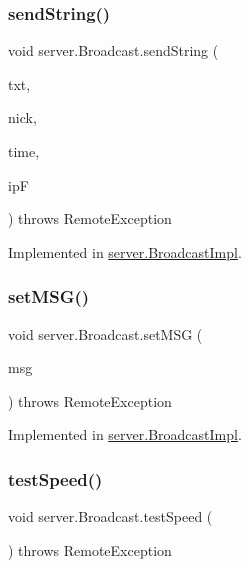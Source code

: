 \subsubsection{\texorpdfstring{send\+String()}{sendString()}}
{\footnotesize\ttfamily void server.\+Broadcast.\+send\+String (\begin{DoxyParamCaption}\item[{String}]{txt,  }\item[{String}]{nick,  }\item[{Local\+Time}]{time,  }\item[{String}]{ipF }\end{DoxyParamCaption}) throws Remote\+Exception}



Implemented in \hyperlink{classserver_1_1_broadcast_impl_a5abfc6721496474d39d6b2b31589d11b}{server.\+Broadcast\+Impl}.

\mbox{\label{interfaceserver_1_1_broadcast_a96f8dad32733e1d5e503435c11e324af}} 
\subsubsection{\texorpdfstring{set\+M\+S\+G()}{setMSG()}}
{\footnotesize\ttfamily void server.\+Broadcast.\+set\+M\+SG (\begin{DoxyParamCaption}\item[{\hyperlink{classstructure_1_1_message}{Message}}]{msg }\end{DoxyParamCaption}) throws Remote\+Exception}



Implemented in \hyperlink{classserver_1_1_broadcast_impl_a264c486f39faa2ab66a7d5a2a0c245b1}{server.\+Broadcast\+Impl}.

\mbox{\label{interfaceserver_1_1_broadcast_a1fe00d7724fded04758454fcd1e61615}} 
\subsubsection{\texorpdfstring{test\+Speed()}{testSpeed()}}
{\footnotesize\ttfamily void server.\+Broadcast.\+test\+Speed (\begin{DoxyParamCaption}{ }\end{DoxyParamCaption}) throws Remote\+Exception}




